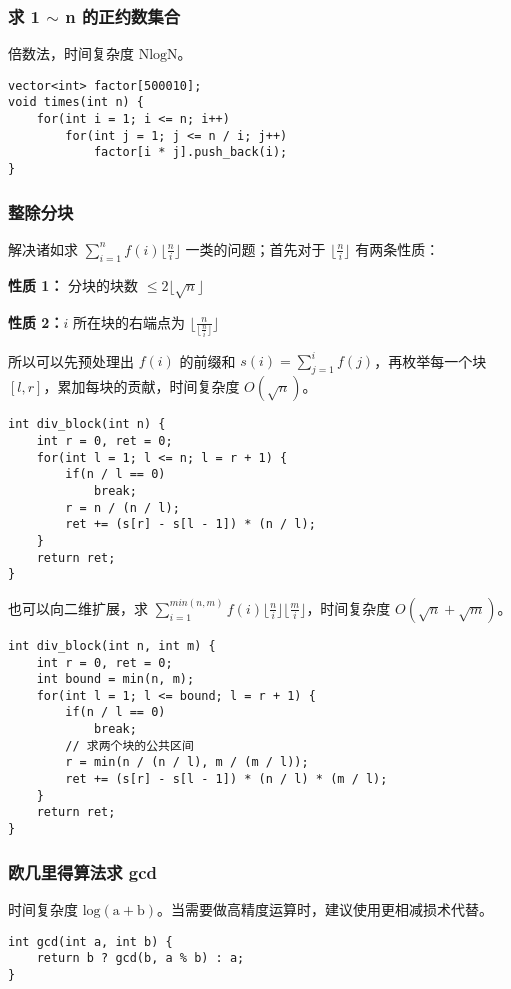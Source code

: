 \documentclass[UTF8]{article}
\begin{document}
\subsubsection{求 1 $\sim$ n 的正约数集合}
倍数法，时间复杂度 $\mathrm{NlogN}$。
\begin{lstlisting}[caption=倍数法求 1 $\sim$ n 的正约数集合]
vector<int> factor[500010];
void times(int n) {
    for(int i = 1; i <= n; i++)
        for(int j = 1; j <= n / i; j++)
            factor[i * j].push_back(i);
}
\end{lstlisting}


\subsubsection{整除分块}
解决诸如求 $\sum_{i=1}^nf(i)\lfloor \frac{n}{i} \rfloor$ 一类的问题；首先对于 $\lfloor \frac{n}{i} \rfloor$ 有两条性质：

\textbf{性质 1：} 分块的块数 $\le 2\lfloor \sqrt{n} \rfloor$

\textbf{性质 2：}$i$ 所在块的右端点为 $\lfloor \frac{n}{\lfloor \frac{n}{i} \rfloor} \rfloor$

所以可以先预处理出 $f(i)$ 的前缀和 $s(i) = \sum^i_{j=1} f(j)$，再枚举每一个块 $[l, r]$，累加每块的贡献，时间复杂度 $O(\sqrt{n})$。
\begin{lstlisting}[caption=整除分块]
int div_block(int n) {
	int r = 0, ret = 0;
	for(int l = 1; l <= n; l = r + 1) {
		if(n / l == 0)
			break;
		r = n / (n / l);
		ret += (s[r] - s[l - 1]) * (n / l);
	}
	return ret;
}
\end{lstlisting}

也可以向二维扩展，求 $\sum_{i=1}^{min(n, m)}f(i) \lfloor \frac{n}{i} \rfloor \lfloor \frac{m}{i} \rfloor$，时间复杂度 $O(\sqrt{n} + \sqrt{m})$。
\begin{lstlisting}[caption=整数分块二维扩展]
int div_block(int n, int m) {
	int r = 0, ret = 0;
	int bound = min(n, m);
	for(int l = 1; l <= bound; l = r + 1) {
		if(n / l == 0)
			break;
		// 求两个块的公共区间
		r = min(n / (n / l), m / (m / l));
		ret += (s[r] - s[l - 1]) * (n / l) * (m / l);
	}
	return ret;
}
\end{lstlisting}


\subsubsection{欧几里得算法求 gcd}
时间复杂度 $\mathrm{log(a + b)}$。当需要做高精度运算时，建议使用更相减损术代替。
\begin{lstlisting}[caption=欧几里得算法求 gcd]
int gcd(int a, int b) {
	return b ? gcd(b, a % b) : a;
}
\end{lstlisting}
\end{document}
